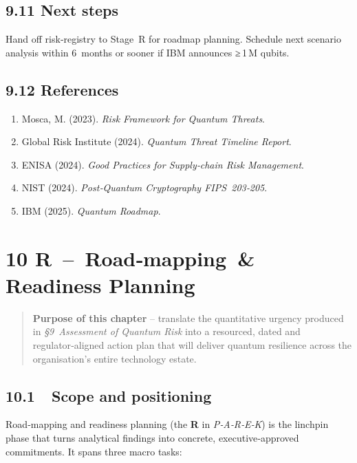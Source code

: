 \documentclass[
  english,
]{article}
\providecommand{\tightlist}{%
  \setlength{\itemsep}{0pt}\setlength{\parskip}{0pt}}
\begin{document}
\subsection{9.11 Next steps}\label{next-steps-1}

Hand off risk‑registry to Stage~R for roadmap planning. Schedule next
scenario analysis within 6~months or sooner if IBM announces ≥\,1\,M
qubits.

\subsection{9.12 References}\label{references-1}

\begin{enumerate}
\def\labelenumi{\arabic{enumi}.}
\tightlist
\item
  Mosca, M. (2023). \emph{Risk Framework for Quantum Threats}.
\item
  Global Risk Institute (2024). \emph{Quantum Threat Timeline Report}.
\item
  ENISA (2024). \emph{Good Practices for Supply‑chain Risk Management}.
\item
  NIST (2024). \emph{Post‑Quantum Cryptography FIPS~203‑205}.
\item
  IBM (2025). \emph{Quantum Roadmap}.
\end{enumerate}

\section{10 R~--~Road‑mapping~\& Readiness
Planning}\label{r-roadmapping-readiness-planning-1}

\begin{quote}
\textbf{Purpose of this chapter} -- translate the quantitative urgency
produced in \emph{§9~Assessment of Quantum Risk} into a resourced, dated
and regulator‑aligned action plan that will deliver quantum resilience
across the organisation's entire technology estate.
\end{quote}

\subsection{10.1~~Scope and positioning}\label{scope-and-positioning}

Road‑mapping and readiness planning (the \textbf{R} in \emph{P‑A‑R‑E‑K})
is the linchpin phase that turns analytical findings into concrete,
executive‑approved commitments. It spans three macro tasks:
\end{document}
